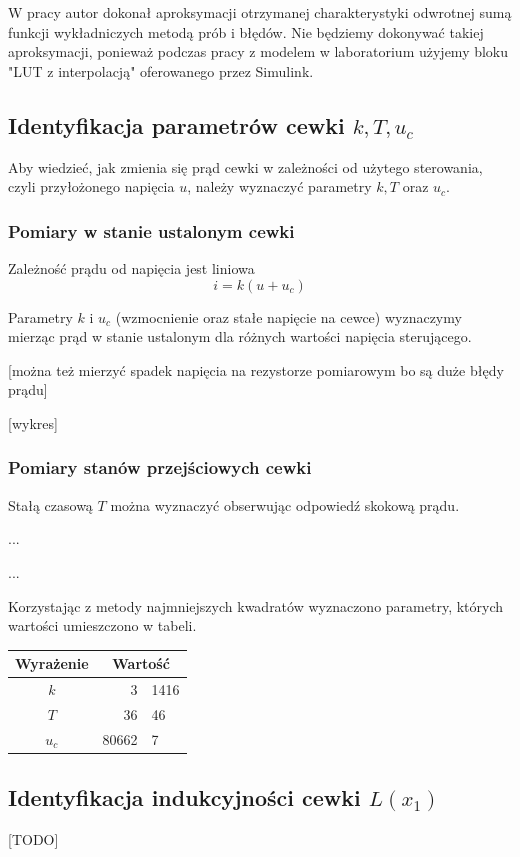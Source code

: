 W pracy \cite{Bania1999} autor dokonał aproksymacji otrzymanej charakterystyki odwrotnej sumą funkcji wykładniczych metodą prób i błędów. Nie będziemy dokonywać takiej aproksymacji, ponieważ podczas pracy z modelem w laboratorium użyjemy bloku "LUT z interpolacją" oferowanego przez Simulink.



\subsection{Identyfikacja parametrów cewki $k, T, u_c$ }

Aby wiedzieć, jak zmienia się prąd cewki w zależności od użytego sterowania, czyli przyłożonego napięcia $u$, należy wyznaczyć parametry $k, T$ oraz $u_c$.

\subsubsection{Pomiary w stanie ustalonym cewki}

Zależność prądu od napięcia jest liniowa
\begin{equation}
i = k(u + u_c)
\end{equation}

Parametry $k$ i $u_c$ (wzmocnienie oraz stałe napięcie na cewce) wyznaczymy mierząc prąd w stanie ustalonym dla różnych wartości napięcia sterującego.

[można też mierzyć spadek napięcia na rezystorze pomiarowym bo są duże błędy prądu]

[wykres]

\subsubsection{Pomiary stanów przejściowych cewki}

Stałą czasową $T$ można wyznaczyć obserwując odpowiedź skokową prądu.


...

...





Korzystając z metody najmniejszych kwadratów wyznaczono parametry, których wartości umieszczono w tabeli.

\begin{tabular}{c r @{,} l}
Wyrażenie &
\multicolumn{2}{c}{Wartość}\\ \hline
$k$ & 3&1416 \\
$T$ & 36&46 \\
$u_c$ & 80662&7 \\
\end{tabular}



\subsection{Identyfikacja indukcyjności cewki $L(x_1)$}

[TODO]



